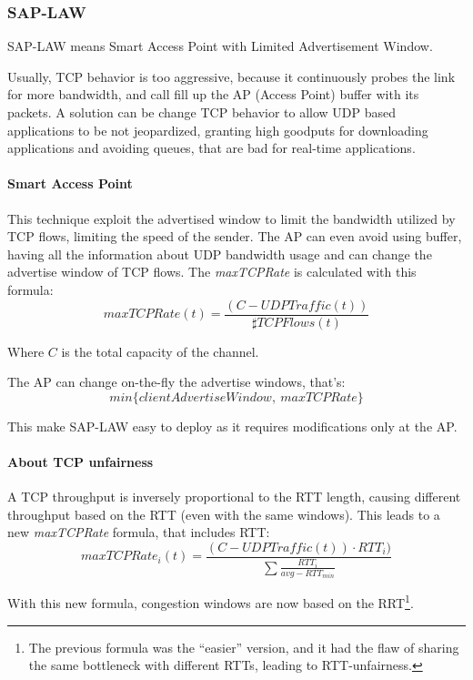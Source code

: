 \subsubsection{SAP-LAW}

SAP-LAW means Smart Access Point with Limited Advertisement Window.

Usually, TCP behavior is too aggressive, because it continuously probes the link
for more bandwidth, and call fill up the AP (Access Point) buffer with its
packets. A solution can be change TCP behavior to allow UDP based applications
to be not jeopardized, granting high goodputs for downloading applications and
avoiding queues, that are bad for real-time applications.

\paragraph*{Smart Access Point} This technique exploit the advertised window to
limit the bandwidth utilized by TCP flows, limiting the speed of the sender. The
AP can even avoid using buffer, having all the information about UDP bandwidth
usage and can change the advertise window of TCP flows. The \textit{maxTCPRate}
is calculated with this formula:
\begin{equation}
  maxTCPRate(t) = \frac{(C - UDPTraffic(t))}{\sharp TCPFlows(t)}
\end{equation}

Where $C$ is the total capacity of the channel.

The AP can change on-the-fly the advertise windows, that's:
\begin{equation*}
  min \{clientAdvertiseWindow,\ maxTCPRate \}
\end{equation*}

This make SAP-LAW easy to deploy as it requires modifications only at the AP.

\paragraph*{About TCP unfairness} A TCP throughput is inversely proportional to
the RTT length, causing different throughput based on the RTT (even with the
same windows). This leads to a new \textit{maxTCPRate} formula, that includes
RTT:
\begin{equation}
maxTCPRate_{i}(t) = \frac{(C - UDPTraffic(t)) \cdot RTT_i)}{\sum
\frac{RTT_i}{avg - RTT_{min}}}
\end{equation}

With this new formula, congestion windows are now based on the RRT\footnote{
  The previous formula was the ``easier'' version, and it had the flaw of
sharing the same bottleneck with different RTTs, leading to RTT-unfairness.
}.

